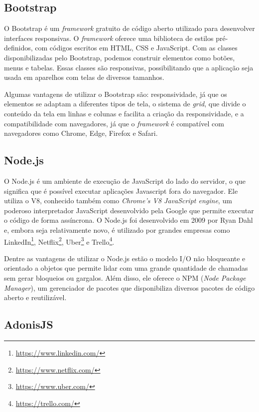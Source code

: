 \subsection{Bootstrap}

O Bootstrap é um \textit{framework} gratuito de código aberto utilizado para desenvolver interfaces responsivas. O \textit{framework} oferece uma biblioteca de estilos pré-definidos, com códigos escritos em HTML, CSS e JavaScript. Com as classes disponibilizadas pelo Bootstrap, podemos construir elementos como botões, menus e tabelas. Essas classes são responsivas, possibilitando que a aplicação seja usada em aparelhos com telas de diversos tamanhos.

Algumas vantagens de utilizar o Bootstrap são: responsividade, já que os elementos se adaptam a diferentes tipos de tela, o sistema de \textit{grid}, que divide o conteúdo da tela em linhas e colunas e facilita a criação da responsividade, e a compatibilidade com navegadores, já que o \textit{framework} é compatível com navegadores como Chrome, Edge, Firefox e Safari.

\subsection{Node.js}

O Node.js é um ambiente de execução de JavaScript do lado do servidor, o que significa que é possível executar aplicações Javascript fora do navegador. Ele utiliza o V8, conhecido também como \textit{Chrome’s V8 JavaScript engine}, um poderoso interpretador JavaScript desenvolvido pela Google que permite executar o código de forma assíncrona. O Node.js foi desenvolvido em 2009 por Ryan Dahl e, embora seja relativamente novo, é utilizado por grandes empresas como LinkedIn\footnote{\url{https://www.linkedin.com/}}, Netflix\footnote{\url{https://www.netflix.com/}}, Uber\footnote{\url{https://www.uber.com/}} e Trello\footnote{\url{https://trello.com/}}. \cite{brewster_2021}

Dentre as vantagens de utilizar o Node.js estão o modelo I/O não bloqueante e orientado a objetos que permite lidar com uma grande quantidade de chamadas sem gerar bloqueios ou gargalos. Além disso, ele oferece o NPM (\textit{Node Package Manager}), um gerenciador de pacotes que disponibiliza diversos pacotes de código aberto e reutilizável.


\subsection{AdonisJS}

